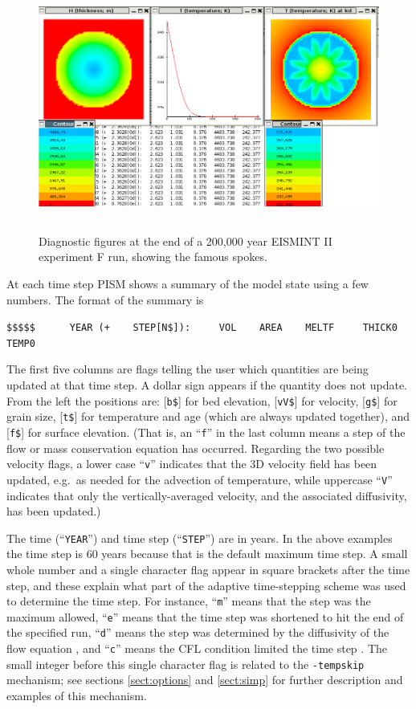 \documentclass[11pt,final]{amsart}
\renewcommand{\t}[1]{\texttt{#1}}
\begin{document}
\begin{figure}[ht]
\includegraphics[height=3.2in,keepaspectratio=true]{figs/eisIIFshot}
\caption{Diagnostic figures at the end of a 200,000 year EISMINT II experiment F run, showing the famous spokes.}
\label{fig:screenshot}
\end{figure}

At each time step PISM shows a summary of the model state using a few numbers.  The format of the summary is

\small\verb|$$$$$      YEAR (+    STEP[N$]):     VOL    AREA    MELTF     THICK0     TEMP0|\normalsize

\noindent The first five columns are flags telling the user which quantities are being updated at that time step.  A dollar sign appears if the quantity does not update.  From the left the positions are: [\t{b\$}] for bed elevation, [\t{vV\$}] for velocity, [\t{g\$}] for grain size, [\t{t\$}] for temperature and age (which are always updated together), and [\t{f\$}] for surface elevation.   (That is, an ``\verb|f|'' in the last column means a step of the flow or mass conservation equation has occurred.  Regarding the two possible velocity flags, a lower case ``\texttt{v}'' indicates that the 3D velocity field has been updated, e.g.~as needed for the advection of temperature, while uppercase ``\texttt{V}'' indicates that only the vertically-averaged velocity, and the associated diffusivity, has been updated.)

The time (``\t{YEAR}'') and time step (``\t{STEP}'') are in years.  In the above examples the time step is 60 years because that is the default maximum time step.  A small whole number and a single character flag appear in square brackets after the time step, and these explain what part of the adaptive time-stepping scheme was used to determine the time step.  For instance, ``\t{m}'' means that the step was the maximum allowed, ``\t{e}'' means that the time step was shortened to hit the end of the specified run, ``\t{d}'' means the step was determined by the diffusivity of the flow equation \cite{BBL}, and ``\t{c}'' means the CFL condition limited the time step \cite{BBL,MortonMayers}.  The small integer before this single character flag is related to the \verb|-tempskip| mechanism; see sections \ref{sect:options} and \ref{sect:simp} for further description and examples of this mechanism.
\end{document}
